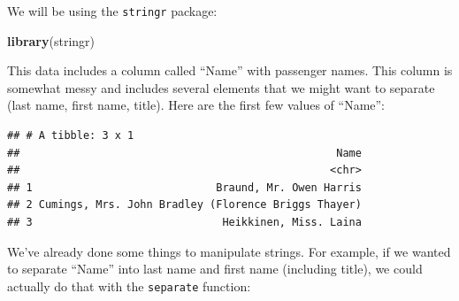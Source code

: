 \documentclass[]{book}
\makeatletter
\newenvironment{Shaded}{\begin{snugshade}}{\end{snugshade}}
\newcommand{\KeywordTok}[1]{\textcolor[rgb]{0.13,0.29,0.53}{\textbf{#1}}}
\newcommand{\DataTypeTok}[1]{\textcolor[rgb]{0.13,0.29,0.53}{#1}}
\newcommand{\DecValTok}[1]{\textcolor[rgb]{0.00,0.00,0.81}{#1}}
\newcommand{\StringTok}[1]{\textcolor[rgb]{0.31,0.60,0.02}{#1}}
\newcommand{\OperatorTok}[1]{\textcolor[rgb]{0.81,0.36,0.00}{\textbf{#1}}}
\newcommand{\NormalTok}[1]{#1}
\newenvironment{kframe}{%
\medskip{}
\setlength{\fboxsep}{.8em}
 \def\at@end@of@kframe{}%
 \ifinner\ifhmode%
  \def\at@end@of@kframe{\end{minipage}}%
  \begin{minipage}{\columnwidth}%
 \fi\fi%
 \def\FrameCommand##1{\hskip\@totalleftmargin \hskip-\fboxsep
 \colorbox{shadecolor}{##1}\hskip-\fboxsep
     \hskip-\linewidth \hskip-\@totalleftmargin \hskip\columnwidth}%
 \MakeFramed {\advance\hsize-\width
   \@totalleftmargin\z@ \linewidth\hsize
   \@setminipage}}%
 {\par\unskip\endMakeFramed%
 \at@end@of@kframe}
\renewenvironment{Shaded}{\begin{kframe}}{\end{kframe}}
\theoremstyle{definition}
\theoremstyle{definition}
\theoremstyle{definition}
\theoremstyle{remark}
\makeatother
\begin{document}
We will be using the \texttt{stringr} package:

\begin{Shaded}
\begin{Highlighting}[]
\KeywordTok{library}\NormalTok{(stringr)}
\end{Highlighting}
\end{Shaded}

This data includes a column called ``Name'' with passenger names. This
column is somewhat messy and includes several elements that we might
want to separate (last name, first name, title). Here are the first few
values of ``Name'':

\begin{Shaded}
\end{Shaded}

\begin{verbatim}
## # A tibble: 3 x 1
##                                                  Name
##                                                 <chr>
## 1                             Braund, Mr. Owen Harris
## 2 Cumings, Mrs. John Bradley (Florence Briggs Thayer)
## 3                              Heikkinen, Miss. Laina
\end{verbatim}

We've already done some things to manipulate strings. For example, if we
wanted to separate ``Name'' into last name and first name (including
title), we could actually do that with the \texttt{separate} function:

\begin{Shaded}
\end{Shaded}
\end{document}
